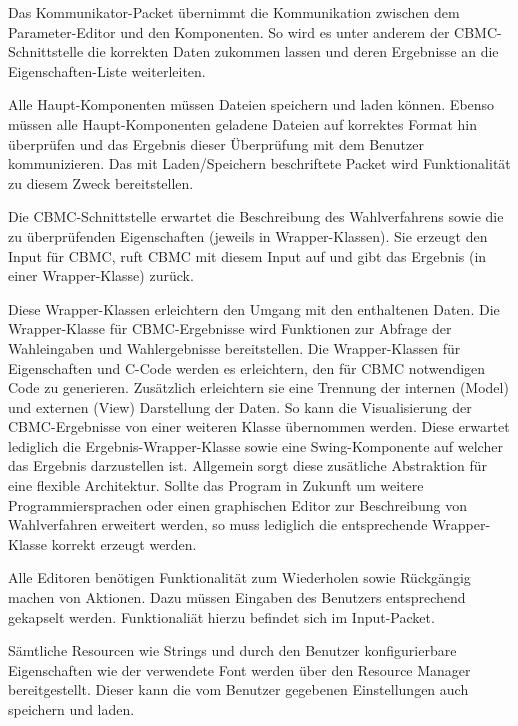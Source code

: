 \documentclass[a4paper]{scrreprt}
\begin{document}
Das Kommunikator-Packet übernimmt die Kommunikation zwischen dem Parameter-Editor und den Komponenten. So wird es unter anderem der CBMC-Schnittstelle die korrekten Daten zukommen lassen und deren Ergebnisse an die Eigenschaften-Liste weiterleiten.

Alle Haupt-Komponenten müssen Dateien speichern und laden können. Ebenso müssen alle Haupt-Komponenten geladene Dateien auf korrektes Format hin überprüfen und das Ergebnis dieser Überprüfung mit dem Benutzer kommunizieren. Das mit Laden/Speichern beschriftete Packet wird Funktionalität zu diesem Zweck bereitstellen. 

Die CBMC-Schnittstelle erwartet die Beschreibung des Wahlverfahrens sowie die zu überprüfenden Eigenschaften (jeweils in Wrapper-Klassen). Sie erzeugt den Input für CBMC, ruft CBMC mit diesem Input auf und gibt das Ergebnis (in einer Wrapper-Klasse) zurück.

Diese Wrapper-Klassen erleichtern den Umgang mit den enthaltenen Daten. Die Wrapper-Klasse für CBMC-Ergebnisse wird Funktionen zur Abfrage der Wahleingaben und Wahlergebnisse bereitstellen. Die Wrapper-Klassen für Eigenschaften und C-Code werden es erleichtern, den für CBMC notwendigen Code zu generieren. Zusätzlich erleichtern sie eine Trennung der internen (Model) und externen (View) Darstellung der Daten. So kann die Visualisierung der CBMC-Ergebnisse von einer weiteren Klasse übernommen werden. Diese erwartet lediglich die Ergebnis-Wrapper-Klasse sowie eine Swing-Komponente auf welcher das Ergebnis darzustellen ist. Allgemein sorgt diese zusätliche  Abstraktion für eine flexible Architektur. Sollte das Program in Zukunft um weitere Programmiersprachen oder einen graphischen Editor zur Beschreibung von Wahlverfahren erweitert werden, so muss lediglich die entsprechende Wrapper-Klasse korrekt erzeugt werden.

Alle Editoren benötigen Funktionalität zum Wiederholen sowie Rückgängig machen von Aktionen. Dazu müssen Eingaben des Benutzers entsprechend gekapselt werden. Funktionaliät hierzu befindet sich im Input-Packet.

Sämtliche Resourcen wie Strings und durch den Benutzer konfigurierbare Eigenschaften wie der verwendete Font werden über den Resource Manager bereitgestellt. Dieser kann die vom Benutzer gegebenen Einstellungen auch speichern und laden.
\end{document}
